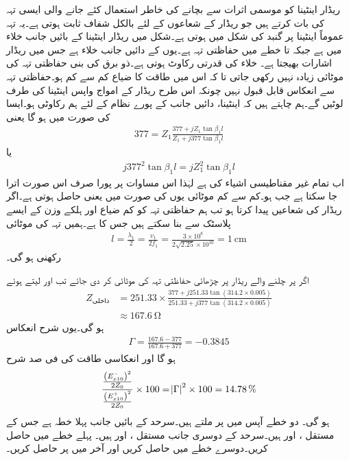  ریڈار اینٹینا کو موسمی اثرات سے بچانے کی خاطر استعمال کئے جانے والی ایسی تہہ کی بات کرتے ہیں جو ریڈار کے شعاعوں کے لئے بالکل شفاف ثابت ہوتی ہے۔یہ تہہ عموماً اینٹینا پر گنبد کی شکل میں ہوتی ہے۔شکل  میں ریڈار اینٹینا  کے بائیں جانب خلاء میں ہے جبکہ  تا  خطے میں حفاظتی تہہ ہے۔یوں  کے دائیں جانب خلاء ہے جس میں ریڈار اشارات بھیجتا ہے۔ خلاء کی قدرتی رکاوٹ  ہوتی ہے۔ذو برق کی بنی حفاظتی تہہ کی موٹائی زیادہ نہیں رکھی جاتی تا کہ اس میں طاقت کا ضیاع کم سے کم ہو۔حفاظتی تہہ سے انعکاس قابل قبول نہیں چونکہ اس طرح ریڈار کے امواج واپس اینٹینا کی طرف لوٹیں گے۔ہم چاہتے ہیں کہ اینٹینا، دائیں جانب کے پورے نظام کے لئے ہم رکاوٹی ہو۔ایسا  کی صورت میں ہو گا یعنی
\begin{align*}
377=Z_1 \frac{377+jZ_1 \tan \beta_1 l}{Z_1+j 377 \tan \beta_1 l}
\end{align*}
یا
\begin{align*}
j 377^2 \tan \beta_1 l =j Z_1^2 \tan \beta_1 l
\end{align*}
اب تمام غیر مقناطیسی اشیاء کی  ہے لہٰذا اس مساوات پر پورا صرف اس صورت اترا جا سکتا ہے جب  ہو۔کم سے کم موٹائی یوں  کی صورت میں  یعنی  حاصل ہوتی ہے۔اگر ریڈار  کی شعاعیں پیدا کرتا ہو تب ہم حفاظتی تہہ کو کم ضیاع اور ہلکے وزن کے ایسے  پلاسٹک  سے بنا سکتے ہیں جس کا  ہے۔ہمیں تہہ کی موٹائی
\begin{align*}
l=\frac{\lambda_1}{2}=\frac{v_1}{2 f_1}=\frac{3\times 10^8}{2 \sqrt{2.25} \times 10^{10}}=\SI{1}{\centi\meter}
\end{align*}
رکھنی ہو گی۔

اگر  پر چلنے والے ریڈار پر چڑھائی حفاظتی تہہ کی موٹائی  کر دی جائے تب  اور  لیتے ہوئے
\begin{align*}
Z_{\text{داخلی}}&=251.33 \times \frac{377+j 251.33 \tan (314.2 \times 0.005)}{251.33+j 377 \tan(314.2\times 0.005)}\\
&\approx \SI{167.6}{\ohm}
\end{align*}
ہو گی۔یوں شرح انعکاس
\begin{align*}
\Gamma=\frac{167.6-377}{167.6+377}=-0.3845
\end{align*}
ہو گا اور انعکاسی طاقت کی فی صد شرح
\begin{align*}
\frac{\frac{\left(E_{x10}^-\right)^2}{2Z_0}}{\frac{\left(E_{x10}^+\right)^2}{2Z_0}} \times 100=\abs{\Gamma}^2 \times 100=\SI{14.78}{\%}
\end{align*}
ہو گی۔
دو خطے آپس میں  پر ملتے ہیں۔سرحد کے بائیں جانب پہلا خطہ ہے جس کے مستقل ،  اور  ہیں۔سرحد کے دوسری جانب مستقل ،  اور  ہیں۔ پہلے خطے میں  حاصل کریں۔دوسرے خطے میں  حاصل کریں اور آخر میں  پر  حاصل کریں۔

